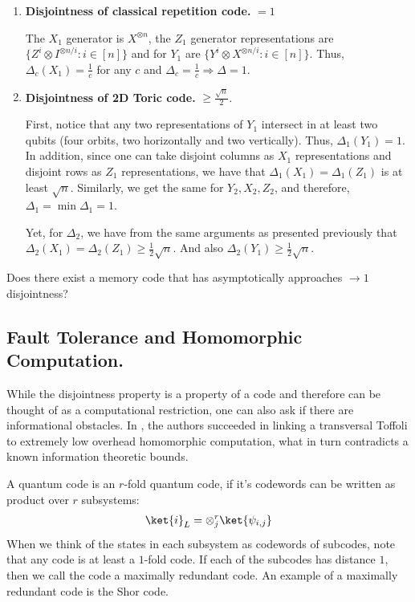 \begin{enumerate}
  \item \textbf{Disjointness of classical repetition code.} $ = 1$ 


    The $X_{1}$ generator is $X^{\otimes n}$, the $Z_{1}$ generator representations are $ \{ Z^{i} \otimes I^{\otimes n / i} : i \in [n] \} $ and for $Y_{1}$ are  $ \{ Y^{i} \otimes X^{\otimes n/i }  : i \in [n]  \}  $. Thus, $\Delta_{c}(X_{1}) = \frac{1}{c}$ for any $c$ and $\Delta_{c} = \frac{1}{c} \Rightarrow \Delta = 1$.
  \item \textbf{Disjointness of 2D Toric code.} $\ge \frac{\sqrt{n}}{2}$. 

First, notice that any two representations of $Y_{1}$ intersect in at least two qubits (four orbits, two horizontally and two vertically). Thus, $\Delta_{1}\left( Y_{1} \right) = 1$. In addition, since one can take disjoint columns as $X_{1}$ representations and disjoint rows as $Z_{1}$ representations, we have that $\Delta_{1}(X_1) = \Delta_{1}(Z_1)$ is at least $\sqrt{n}$. Similarly, we get the same for $Y_{2}, X_{2}, Z_{2}$, and therefore, $\Delta_{1} = \min \Delta_{1} = 1$.
    
Yet, for $\Delta_{2}$, we have from the same arguments as presented previously that $\Delta_{2}(X_{1}) = \Delta_{2}(Z_{1}) \ge \frac{1}{2}\sqrt{n}$. And also $\Delta_{2}(Y_{1}) \ge \frac{1}{2}\sqrt{n}$.

\end{enumerate}

  \begin{oproblem}
    Does there exist a memory code that has asymptotically approaches $\rightarrow 1$ disjointness? 
  \end{oproblem}



\subsection{Fault Tolerance and Homomorphic Computation.  }



While the disjointness property is a property of a code and therefore can be thought of as a computational restriction, one can also ask if there are informational obstacles. In \cite{newman2017limitationstransversalcomputationquantum}, the authors succeeded in linking a transversal Toffoli to extremely low overhead homomorphic computation, what in turn contradicts a known information theoretic bounds. 
\begin{definition}
  A quantum code is an $r$-fold quantum code, if it's codewords can be written as product over $r$ subsystems: 
  \begin{equation*}
    \begin{split}
      \ket{i}_{L} =  \otimes^{r}_{j}\ket{\psi_{i,j}}  
    \end{split}
  \end{equation*} When we think of the states in each subsystem as codewords of subcodes, note that any code is at least a $1$-fold code. If each of the subcodes has distance $1$, then we call the code a maximally redundant code. An example of a maximally redundant code is the Shor code.
\end{definition}

